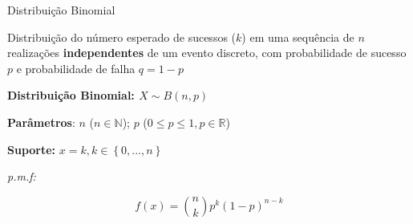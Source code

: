 \documentclass{beamer}\usepackage[]{graphicx}\usepackage[]{color}
\begin{document}
\begin{frame}{Distribuição Binomial}

\small{Distribuição do número esperado de sucessos ($k$) em uma sequência de $n$ realizações \textbf{independentes} de um evento discreto, com probabilidade de sucesso $p$ e probabilidade de falha $q = 1-p$}

  
\vfill

\textbf{Distribuição Binomial: $X \sim B(n,p)$}
  
\textbf{Parâmetros}: $n$ ($n \in \mathbb{N}$); $p$ ($0 \leq p \leq 1, p \in \mathbb{R}$)

\textbf{Suporte:} $x = k, k \in \left\{0,\ldots,n\right\}$

\emph{p.m.f:}

  \begin{equation*}
    f(x) = \binom{n}{k} p^k(1-p)^{n-k}
  \end{equation*}

\end{frame} 
\end{document}
